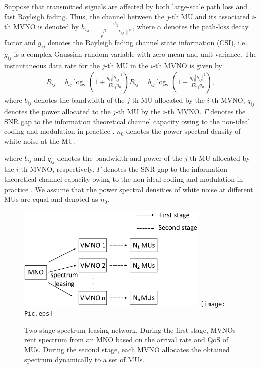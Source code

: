 \documentclass[journal]{IEEEtran}
\begin{document}
\begin{IEEEkeywords}
Suppose that transmitted signals are affected by both large-scale path loss and fast Rayleigh fading. Thus, the channel between the $j$-th MU and its associated $i$-th MVNO is denoted by $h_{ij} = \frac{g_{ij}}{\sqrt{1 + {\left\| \mathbf{x}_{ij} \right\|}^\alpha}}$, where $\alpha$ denotes the path-loss decay factor  and $g_{ij}$ denotes the Rayleigh fading channel state information (CSI), i.e., $g_{ij}$ is a complex Gaussian random variable with zero mean and unit variance. The instantaneous data rate for the $j$-th MU in the $i$-th MVNO is given by
\begin{align}
	R_{ij} = b_{ij}\log_2\left(1 + \frac{q_{ij} \left|h_{ij} \right|^2 }{\Gamma b_{ij}n_0}\right)
	R_{ij} = b_{ij}\log_2\left(1 + \frac{q_{ij} \left|h_{ij} \right|^2 }{\Gamma b_{ij}\sigma_0}\right),
\end{align}
where $b_{ij}$ denotes the bandwidth of the $j$-th MU allocated by the $i$-th MVNO, $q_{ij}$ denotes the power allocated to the $j$-th MU by the $i$-th MVNO. $\Gamma$ denotes the SNR gap to the information theoretical channel capacity owing to the
non-ideal coding and modulation in practice \cite{JGDForney}. $n_0$ denotes the power spectral density of white noise at the MU.    
                  
where $b_{ij}$ and $q_{ij}$ denotes the bandwidth and power of the $j$-th MU allocated by the $i$-th MVNO, respectively. $\Gamma$ denotes the SNR gap to the information theoretical channel capacity owing to the
non-ideal coding and modulation in practice \cite{JGDForney}. We assume that the power spectral densities of white noise at different MUs are equal and denoted as $n_0$.                  
\begin{figure}
	\centering
	\includegraphics[width=3.6in]{Pic1.eps}
	\texttt{[image: Pic.eps]}
	\caption{Two-stage spectrum leasing network. During the first stage, MVNOs rent spectrum from an MNO based on the arrival rate and QoS of MUs. During the second stage, each MVNO allocates the obtained spectrum dynamically to a set of MUs.}
\end{figure}


\end{IEEEkeywords}
\end{document}
